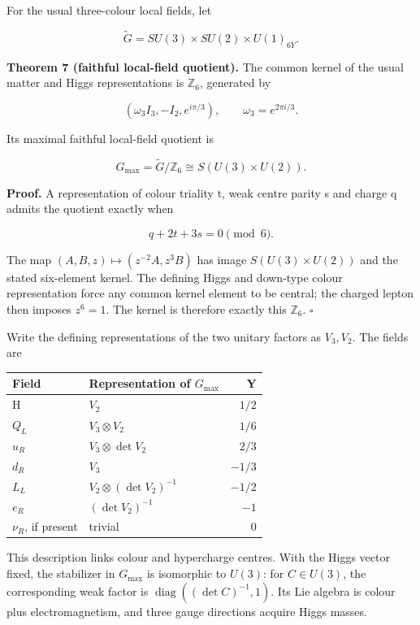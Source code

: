 \documentclass[
  11pt,
  a4paper,
]{article}
\newcounter{none} %
\begin{document}
For the usual three-colour local fields, let

\[
 \widetilde G=SU(3)\times SU(2)\times U(1)_{6Y}.
\]

\textbf{Theorem 7 (faithful local-field quotient).} The common kernel of the usual matter and Higgs representations is \(\mathbb Z_6\), generated by

\[
 (\omega_3I_3,-I_2,e^{i\pi/3}),\qquad\omega_3=e^{2\pi i/3}.
\]

Its maximal faithful local-field quotient is

\[
 G_{\max}=\widetilde G/\mathbb Z_6\cong S(U(3)\times U(2)).
\]

\textbf{Proof.} A representation of colour triality t, weak centre parity s and charge q admits the quotient exactly when

\[
 q+2t+3s=0\pmod6. \tag{4}
\]

The map \((A,B,z)\mapsto(z^{-2}A,z^3B)\) has image \(S(U(3)\times U(2))\) and the stated six-element kernel. The defining Higgs and down-type colour representation force any common kernel element to be central; the charged lepton then imposes \(z^6=1\). The kernel is therefore exactly this \(\mathbb Z_6\). \(\square\)

Write the defining representations of the two unitary factors as \(V_3,V_2\). The fields are

{\def\LTcaptype{none} %
\begin{longtable}[]{@{}llr@{}}
\toprule\noalign{}
Field & Representation of \(G_{\max}\) & Y \\
\midrule\noalign{}
\endhead
\bottomrule\noalign{}
\endlastfoot
H & \(V_2\) & \(1/2\) \\
\(Q_L\) & \(V_3\otimes V_2\) & \(1/6\) \\
\(u_R\) & \(V_3\otimes\det V_2\) & \(2/3\) \\
\(d_R\) & \(V_3\) & \(-1/3\) \\
\(L_L\) & \(V_2\otimes(\det V_2)^{-1}\) & \(-1/2\) \\
\(e_R\) & \((\det V_2)^{-1}\) & \(-1\) \\
\(\nu_R\), if present & trivial & 0 \\
\end{longtable}
}

This description links colour and hypercharge centres. With the Higgs vector fixed, the stabilizer in \(G_{\max}\) is isomorphic to \(U(3)\): for \(C\in U(3)\), the corresponding weak factor is \(\operatorname{diag}((\det C)^{-1},1)\). Its Lie algebra is colour plus electromagnetism, and three gauge directions acquire Higgs masses.
\end{document}

